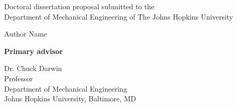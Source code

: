 



\TitlePageSpacing \thispagestyle{empty}

\begin{center}
    Doctoral dissertation proposal submitted to the \\
    Department of Mechanical Engineering of The Johns Hopkins University
    
    \vspace{0.5in}                      %
    { \par}  
    
    \vspace{0.25in}                     %
    
    Author Name                         %
\end{center}
\vspace{0.5in}




\begin{center}
    \textbf{Primary advisor}
    
    Dr. Chuck Darwin \\
    Professor \\
    Department of Mechanical Engineering \\
    Johns Hopkins University, Baltimore, MD
\end{center}

